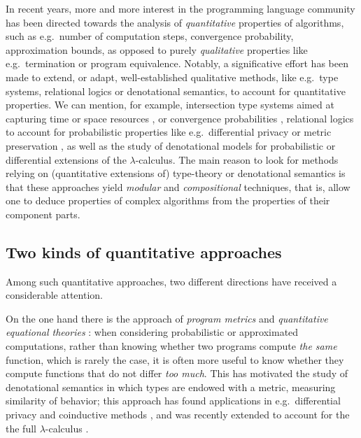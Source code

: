 
In recent years, more and more interest in the programming language community has been directed towards the analysis of \emph{quantitative} properties of algorithms, such as e.g.~number of computation steps, convergence probability, 
approximation bounds, 
as opposed to purely \emph{qualitative} properties like e.g.~termination or program equivalence. 
Notably, a significative effort has been made to extend, or adapt, well-established qualitative methods, like e.g.~type systems, relational logics or denotational semantics, to account for quantitative properties. We can mention, for example, 
intersection type systems aimed at capturing time or space resources \cite{decarvalho2018, Accattoli2022}, or convergence probabilities \cite{Breuvart2018, PistoneLICS2022},  relational logics to account for probabilistic properties like e.g.~differential privacy \cite{Barthe_2012} or metric preservation \cite{Reed2010, dallago}, as well as the study of denotational models for 
probabilistic \cite{Ehrhard2011, Staton2017} or differential \cite{difflambda} extensions of the $\lambda$-calculus. 
The main reason to look for methods relying on (quantitative extensions of) type-theory or denotational semantics is that these approaches yield \emph{modular} and \emph{compositional} techniques, that is, allow one to deduce properties of complex algorithms from the properties of their component parts.   

\subsection{Two kinds of quantitative approaches}

Among such quantitative approaches, two different directions have received a considerable attention. 

On the one hand there is the approach of \emph{program metrics} \cite{Reed2010, Gaboardi2017, Gabo2019} and \emph{quantitative equational theories} \cite{Plotk}: when considering probabilistic or approximated computations, rather than knowing whether two programs compute \emph{the same} function, which is rarely the case, it is often more useful to know whether they compute functions that do not differ \emph{too much}. This has motivated the study of denotational semantics in which types are endowed with a metric, measuring similarity of behavior; this approach has found  applications in e.g.~differential privacy \cite{Reed2010} and coinductive methods \cite{Bonchi2018}, and was recently extended to account for the the full $\lambda$-calculus \cite{Geoffroy2020, PistoneLICS, PistoneFSCD2022}.

